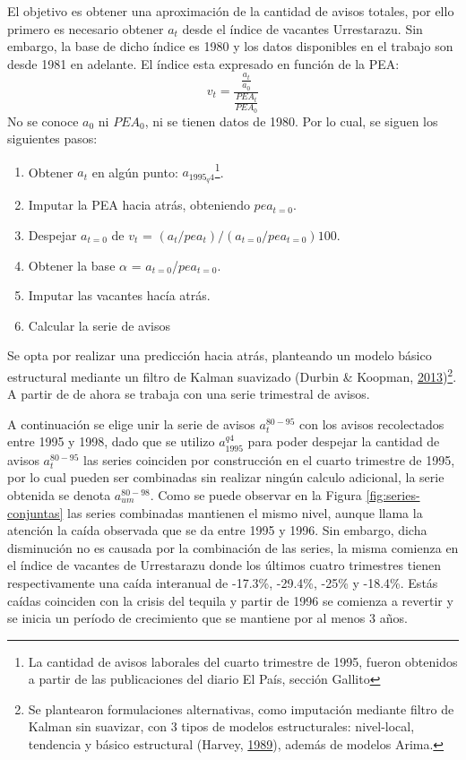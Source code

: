 \documentclass[12pt,oneside]{reedthesis}
\providecommand{\tightlist}{%
  \setlength{\itemsep}{0pt}\setlength{\parskip}{0pt}}
\begin{document}
El objetivo es obtener una aproximación de la cantidad de avisos totales, por ello primero es necesario obtener \(a_t\) desde el índice de vacantes Urrestarazu. Sin embargo, la base de dicho índice es 1980 y los datos disponibles en el trabajo son desde 1981 en adelante. El índice esta expresado en función de la PEA:
\begin{equation}
v_t = \frac{\frac{a_t}{a_0}}{\frac{PEA_t}{PEA_0}}
\end{equation}
No se conoce \(a_0\) ni \(PEA_0\), ni se tienen datos de 1980. Por lo cual, se siguen los siguientes pasos:
\begin{enumerate}
\def\labelenumi{\arabic{enumi}.}
\tightlist
\item
  Obtener \(a_t\) en algún punto: \(a_{1995_q4}\)\footnote{La cantidad de avisos laborales del cuarto trimestre de 1995, fueron obtenidos a partir de las publicaciones del diario El País, sección Gallito}.
\item
  Imputar la PEA hacia atrás, obteniendo \(pea_{t=0}\).
\item
  Despejar \(a_{t=0}\) de
  \(v_t\) = \((a_t/pea_t)/(a_{t=0}/pea_{t=0})100\).
\item
  Obtener la base \(\alpha\) = \(a_{t=0}\)/\(pea_{t=0}\).
\item
  Imputar las vacantes hacía atrás.
\item
  Calcular la serie de avisos
\end{enumerate}
Se opta por realizar una predicción hacia atrás, planteando un modelo básico estructural mediante un filtro de Kalman suavizado (Durbin \& Koopman, \protect\hyperlink{ref-Durbin2013}{2013})\footnote{Se plantearon formulaciones alternativas, como imputación mediante filtro de Kalman sin suavizar, con 3 tipos de modelos estructurales: nivel-local, tendencia y básico estructural (Harvey, \protect\hyperlink{ref-Harvey1989}{1989}), además de modelos Arima.}. A partir de de ahora se trabaja con una serie trimestral de avisos.

A continuación se elige unir la serie de avisos \(a_t^{80-95}\) con los avisos recolectados entre 1995 y 1998, dado que se utilizo \(a_{1995}^{q4}\) para poder despejar la cantidad de avisos \(a_t^{80-95}\) las series coinciden por construcción en el cuarto trimestre de 1995, por lo cual pueden ser combinadas sin realizar ningún calculo adicional, la serie obtenida se denota \(a_{um}^{80-98}\). Como se puede observar en la Figura \ref{fig:series-conjuntas} las series combinadas mantienen el mismo nivel, aunque llama la atención la caída observada que se da entre 1995 y 1996. Sin embargo, dicha disminución no es causada por la combinación de las series, la misma comienza en el índice de vacantes de Urrestarazu donde los últimos cuatro trimestres tienen respectivamente una caída interanual de -17.3\%, -29.4\%, -25\% y -18.4\%. Estás caídas coinciden con la crisis del tequila y partir de 1996 se comienza a revertir y se inicia un período de crecimiento que se mantiene por al menos 3 años.
\end{document}

